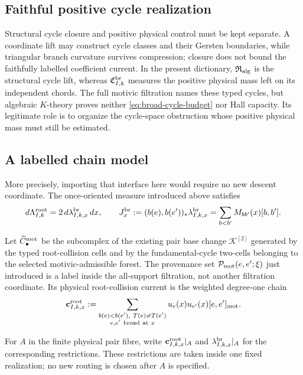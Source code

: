 \documentclass[11pt]{article}
\begin{document}
\subsection{Faithful positive cycle realization}

Structural cycle closure and positive physical control must be kept separate.
A coordinate lift may construct cycle classes and their Gersten boundaries,
while triangular branch curvature survives compression; closure does not bound
the faithfully labelled coefficient current.  In the present dictionary,
\(\mathfrak R_{\rm alg}\) is the structural cycle lift, whereas
\(\mathfrak C_{I,k}^{\rm br}\) measures the positive physical mass left on its
independent chords.  The full motivic filtration names these typed cycles, but
algebraic \(K\)-theory proves neither
\eqref{eq:broad-cycle-budget} nor Hall capacity.  Its legitimate role is to
organize the cycle-space obstruction whose positive physical mass must still
be estimated.

\subsection{A labelled chain model}

More precisely, importing that interface here would require no new descent
coordinate.  The once-oriented measure introduced above satisfies
\[
 d\Lambda^{\rm root}_{I,k}
 =2\,d\lambda_{I,k,x}^{\rm br}\,dx,
 \qquad
 J_x^{\rm br}
 :=(b(e),b(e'))_\ast\lambda_{I,k,x}^{\rm br}
 =\sum_{b<b'}M_{bb'}(x)[b,b'].
\]

Let \(\widetilde C_\bullet^{\rm mot}\) be the subcomplex of the existing pair
base change \(\mathcal K^{[2]}\) generated by the typed root-collision cells
and by the fundamental-cycle two-cells belonging to the selected
motivic-admissible forest.
The provenance set \(\mathcal P_{\rm mot}(e,e';\xi)\) just introduced is a
label inside the all-support filtration, not another filtration coordinate.
Its physical root-collision current is the weighted degree-one chain
\[
 \mathbf c_{I,k,x}^{\rm root}
 :=\sum_{\substack{b(e)<b(e'),\ T(e)\ne T(e')\\
                   e,e'\ {\rm broad\ at}\ x}}
 u_e(x)u_{e'}(x)[e,e']_{\rm mot}.
\]

For \(A\) in the finite physical pair fibre, write
\(\mathbf c_{I,k,x}^{\rm root}|_A\) and
\(\lambda_{I,k,x}^{\rm br}|_A\) for the corresponding restrictions.  These
restrictions are taken inside one fixed realization; no new routing is chosen
after \(A\) is specified.
\end{document}
